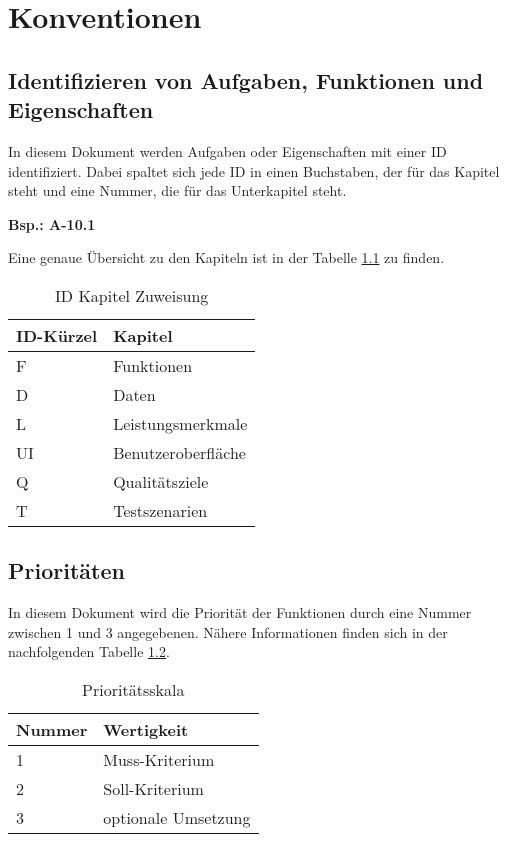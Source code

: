 
\chapter{Konventionen}
\section{Identifizieren von Aufgaben, Funktionen und Eigenschaften}
In diesem Dokument werden Aufgaben oder Eigenschaften mit einer ID identifiziert.
Dabei spaltet sich jede ID in einen Buchstaben, der für das Kapitel steht und eine Nummer, die für das Unterkapitel steht.\\
\begin{center}
    \textbf{Bsp.: A-10.1}
\end{center}
Eine genaue Übersicht zu den Kapiteln ist in der Tabelle \ref{einleitung:kapitel} zu finden.
\begin{table}[H]
    \caption{ID Kapitel Zuweisung}
    \label{einleitung:kapitel}
    \begin{tabularx}{\textwidth}{|l|X|}
        \toprule
        \textbf{ID-Kürzel} & \textbf{Kapitel} \\
        \endhead
        \hline
        F & Funktionen \\
        D & Daten \\
        L & Leistungsmerkmale \\
        UI & Benutzeroberfläche \\
        Q & Qualitätsziele \\
        T & Testszenarien \\
        \hline
    \end{tabularx}
\end{table}

\section{Prioritäten}
In diesem Dokument wird die Priorität der Funktionen durch eine Nummer zwischen 1 und 3 angegebenen. Nähere Informationen finden sich in der nachfolgenden Tabelle \ref{einleitung:priority}.
\begin{table}[H]
    \caption{Prioritätsskala}
    \label{einleitung:priority}
    \begin{tabularx}{\textwidth}{|l|X|}
        \toprule
        \textbf{Nummer} & \textbf{Wertigkeit}\\
        \endhead
        \hline
        1 & Muss-Kriterium\\
        2 & Soll-Kriterium\\
        3 & optionale Umsetzung\\
        \hline
    \end{tabularx}
\end{table}
